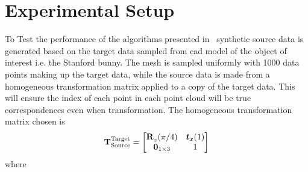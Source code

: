 \section{Experimental Setup}\label{sec:2-pose-estimation-experimental-setup}

To Test the performance of the algorithms presented in~ synthetic source data is generated based on the target data sampled from \gls{cad} model of the object of interest i.e. the Stanford bunny. The mesh is sampled uniformly with \num{1000} data points making up the target data, while the source data is made from a homogeneous transformation matrix applied to a copy of the target data. This will ensure the index  of each point in each point cloud will be true correspondences even when transformation. The homogeneous transformation matrix chosen is
\begin{equation}
	\tf[T]{\text{Target}}{\text{Source}} = 
	\begin{bmatrix}
		\tf[R]{}{z}(\pi/4) & \vec{t}_x(1) \\
		\vec{0}_{1\times 3} & 1
	\end{bmatrix}
\end{equation} 
where 




